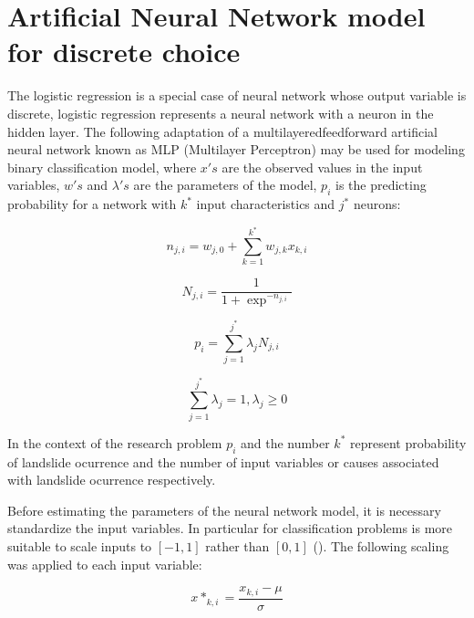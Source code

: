 \documentclass[11pt,twoside]{rmta2010esp}%
\begin{document}

\section{Artificial Neural Network model for discrete choice}
The logistic regression is a special case of neural network whose output variable is
discrete, logistic regression represents a neural network with 
a neuron in the hidden layer. The following adaptation of a multilayeredfeedforward artificial neural network known as  
MLP (Multilayer Perceptron) may be used for modeling binary classification model, where $x's$ are the observed values in the input variables, $w's$ and $\lambda's$ are the parameters of the model, $ p_{i} $ is the predicting probability for a network with $ k^{*} $ input characteristics and $ j^{*} $ neurons: 

\begin{equation}
n_{j,i} = w_{j,0} + \sum_{k=1}^{k^{*}} w_{j,k}x_{k,i}
\end{equation}

\begin{equation}
N_{j,i} = \frac{1}{1+\exp^{-n_{j,i}}}
\end{equation}



\begin{equation}
p_{i} = \sum_{j=1}^{j^{*}} \lambda_{j} N_{j,i}
\end{equation}

\begin{equation}
\sum_{j=1}^{j^{*}} \lambda_{j} = 1 , \lambda_{j} \ge 0
\end{equation}



In the context of the research problem $p_{i} $ and the number $ k^{*} $ represent 
probability of landslide ocurrence and the number of input variables or causes associated with landslide ocurrence respectively.

Before estimating the parameters of the neural network model, it is necessary standardize the input variables. In particular for classification problems is more suitable to scale inputs to $[-1,1]$ rather than $[0,1]$ (\cite{FAQANN}). The following scaling was applied to each input variable: 

\begin{equation}
x*_{k,i} = \frac{x_{k,i} - \mu }{\sigma}
\end{equation}
\end{document}
